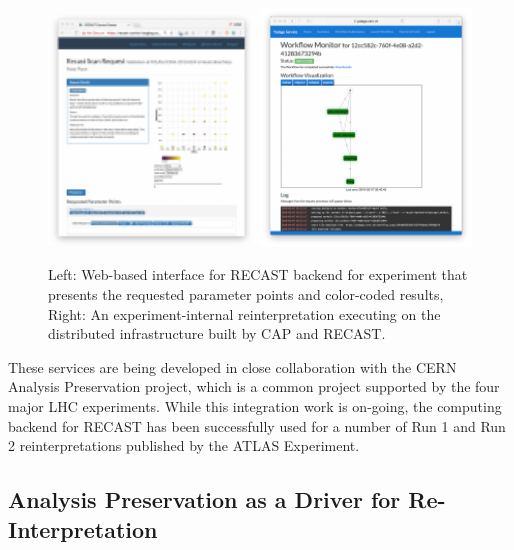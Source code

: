 \begin{figure}[t]
\begin{center}
\includegraphics[width=0.5\textwidth,angle=0]{ch5-figures/requestview.pdf}\includegraphics[width=0.5\textwidth,angle=0]{ch5-figures/monitor.pdf}

\end{center}
\caption{
Left: Web-based interface for RECAST backend for experiment that presents the requested parameter points and color-coded results,
Right: An experiment-internal reinterpretation executing on the distributed infrastructure built by CAP and RECAST.}
\label{fig:recast-cc}
\end{figure}

These services are being developed in close collaboration with the CERN Analysis Preservation project, which is a common project supported by the four major LHC experiments. While this integration work is on-going, the computing backend for RECAST has been successfully used for a number of Run 1 and Run 2 reinterpretations published by the ATLAS Experiment.


\subsection{Analysis Preservation as a Driver for Re-Interpretation}

